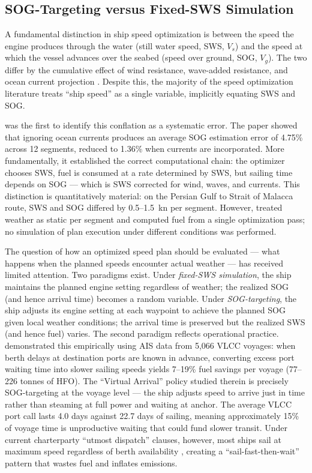 \documentclass[review]{elsarticle}
\begin{document}
\subsection{SOG-Targeting versus Fixed-SWS Simulation}
\label{sec:lit-sog}

A fundamental distinction in ship speed optimization is between the speed the engine produces through the water (still water speed, SWS, $V_s$) and the speed at which the vessel advances over the seabed (speed over ground, SOG, $V_g$). The two differ by the cumulative effect of wind resistance, wave-added resistance, and ocean current projection \cite{Yang2020}. Despite this, the majority of the speed optimization literature treats ``ship speed'' as a single variable, implicitly equating SWS and SOG.

\cite{Yang2020} was the first to identify this conflation as a systematic error. The paper showed that ignoring ocean currents produces an average SOG estimation error of 4.75\% across 12 segments, reduced to 1.36\% when currents are incorporated. More fundamentally, it established the correct computational chain: the optimizer chooses SWS, fuel is consumed at a rate determined by SWS, but sailing time depends on SOG --- which is SWS corrected for wind, waves, and currents. This distinction is quantitatively material: on the Persian Gulf to Strait of Malacca route, SWS and SOG differed by 0.5--1.5~kn per segment. However, \cite{Yang2020} treated weather as static per segment and computed fuel from a single optimization pass; no simulation of plan execution under different conditions was performed.

The question of how an optimized speed plan should be evaluated --- what happens when the planned speeds encounter actual weather --- has received limited attention. Two paradigms exist. Under \emph{fixed-SWS simulation}, the ship maintains the planned engine setting regardless of weather; the realized SOG (and hence arrival time) becomes a random variable. Under \emph{SOG-targeting}, the ship adjusts its engine setting at each waypoint to achieve the planned SOG given local weather conditions; the arrival time is preserved but the realized SWS (and hence fuel) varies. The second paradigm reflects operational practice. \cite{Jia2017} demonstrated this empirically using AIS data from 5,066 VLCC voyages: when berth delays at destination ports are known in advance, converting excess port waiting time into slower sailing speeds yields 7--19\% fuel savings per voyage (77--226 tonnes of HFO). The ``Virtual Arrival'' policy studied therein is precisely SOG-targeting at the voyage level --- the ship adjusts speed to arrive just in time rather than steaming at full power and waiting at anchor. The average VLCC port call lasts 4.0 days against 22.7 days of sailing, meaning approximately 15\% of voyage time is unproductive waiting that could fund slower transit. Under current charterparty ``utmost dispatch'' clauses, however, most ships sail at maximum speed regardless of berth availability \cite{Jia2017}, creating a ``sail-fast-then-wait'' pattern that wastes fuel and inflates emissions.
\end{document}
